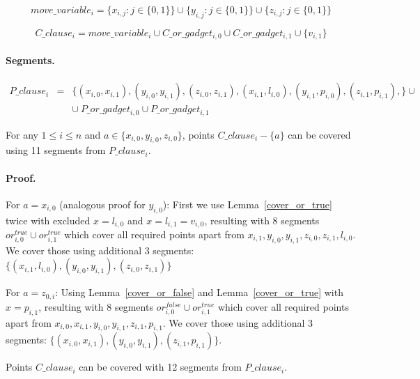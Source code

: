  
 $$move\_variable_i = 
 \{x_{i, j} : j \in \{0, 1\}\} \cup
 \{y_{i, j} : j \in \{0, 1\}\} \cup
 \{z_{i, j} : j \in \{0, 1\}\} 
 $$
 
 $$C\_clause_i = 
 move\_variable_i \cup C\_or\_gadget_{i, 0}
 \cup C\_or\_gadget_{i, 1} \cup \{v_{i, 1} \} 
 $$

\paragraph{Segments.}

\begin{eqnarray*}
P\_clause_i & = & \{ (x_{i, 0}, x_{i, 1}),
(y_{i, 0}, y_{i, 1}),
(z_{i, 0}, z_{i, 1}),
(x_{i, 1}, l_{i, 0}),
(y_{i, 1}, p_{i, 0}),
(z_{i, 1}, p_{i, 1}),
\} \cup \\
& & \cup \ P\_or\_gadget_{i, 0} \cup P\_or\_gadget_{i, 1}
\end{eqnarray*}

\begin{lemma}
\label{cover_clauses_solution_true}
For any $1 \le i \le n$ and $a \in \{ x_{i, 0}, y_{i, 0}, z_{i, 0}\}$,
points $C\_clause_i - \{a\}$ can be covered using 11 segments
from $P\_clause_i$.
\end{lemma}

\paragraph{Proof.}
For $a = x_{i, 0}$ (analogous proof for $y_{i, 0}$):
First we use Lemma~\ref{cover_or_true} twice with excluded $x = l_{i, 0}$ and
$x = l_{i, 1} = v_{i, 0}$,
resulting with 8 segments $or^{true}_{i, 0} \cup or^{true}_{i, 1}$
which cover all required points apart from
$x_{i, 1}, y_{i, 0}, y_{i, 1}, z_{i, 0}, z_{i, 1}, l_{i, 0}$.
We cover those using additional 3 segments:
$\{ (x_{i, 1}, l_{i, 0}), (y_{i, 0}, y_{i, 1}),
(z_{i, 0}, z_{i, 1}) \}$

For $a = z_{0, i}$:
Using Lemma~\ref{cover_or_false} and Lemma~\ref{cover_or_true} with
$x = p_{i, 1}$,
resulting with 8 segments $or^{false}_{i, 0} \cup or^{true}_{i, 1}$
which cover all required points apart from
$x_{i, 0}, x_{i, 1}, y_{i, 0}, y_{i, 1}, z_{i, 1}, p_{i, 1}$.
We cover those using additional 3 segments:
$\{ (x_{i, 0}, x_{i, 1}), (y_{i, 0}, y_{i, 1}),
(z_{i, 1}, p_{i, 1}) \}$.

\begin{lemma}
\label{cover_clauses_solution_false}
 Points $C\_clause_i$ can be covered with 12 segments from $P\_clause_i$.
\end{lemma}

